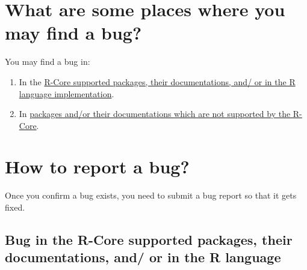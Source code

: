 \documentclass[
]{book}
\begin{document}
\section{What are some places where you may find a bug?}\label{what-are-some-places-where-you-may-find-a-bug}

You may find a bug in:

\begin{enumerate}
\def\labelenumi{\arabic{enumi}.}
\item
  In the \hyperref[RCorePkgBug]{R-Core supported packages, their documentations, and/ or in the R language implementation}.
\item
  In \hyperref[nonRCorePkgBug]{packages and/or their documentations which are not supported by the R-Core}.
\end{enumerate}

\section{How to report a bug?}\label{ReportBug}

Once you confirm a bug exists, you need to submit a bug report so that it gets fixed.

\subsection{Bug in the R-Core supported packages, their documentations, and/ or in the R language}\label{RCorePkgBug}
\end{document}
